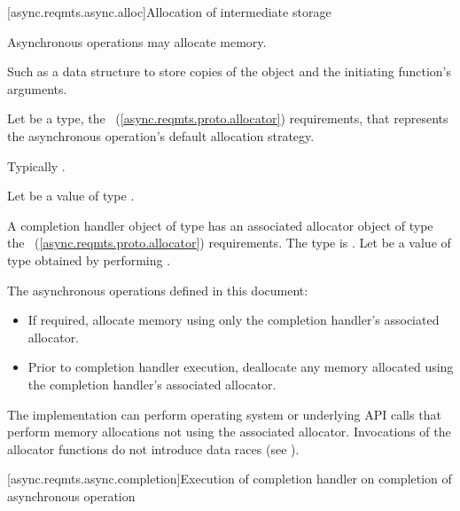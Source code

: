[async.reqmts.async.alloc]{Allocation of intermediate storage}

\pnum
Asynchronous operations may allocate memory. \begin{note} Such as a data structure to store copies of the  object and the initiating function's arguments. \end{note}

\pnum
Let  be a type,  the ~(\ref{async.reqmts.proto.allocator}) requirements, that represents the asynchronous operation's default allocation strategy. \begin{note} Typically . \end{note} Let  be a value of type .

\pnum
A completion handler object of type  has an associated allocator object  of type   the ~(\ref{async.reqmts.proto.allocator}) requirements. The type  is . Let  be a value of type  obtained by performing .

\pnum
 The asynchronous operations defined in this document:

\begin{itemize}
\item
If required, allocate memory using only the completion handler's associated allocator.

\item
Prior to completion handler execution, deallocate any memory allocated using the completion handler's associated allocator.
\end{itemize}

\pnum
 \begin{note} The implementation can perform operating system or underlying API calls that perform memory allocations not using the associated allocator. Invocations of the allocator functions do not introduce data races (see ). \end{note}



[async.reqmts.async.completion]{Execution of completion handler on completion of asynchronous operation}

